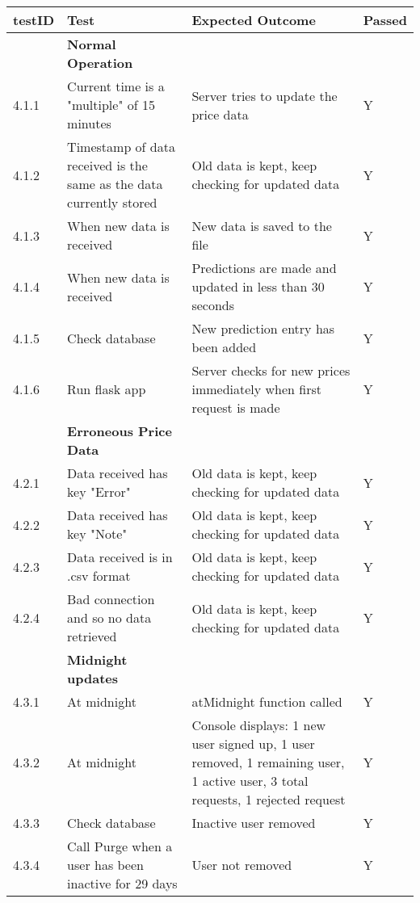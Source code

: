     \begin{tabular}{|p{1cm}|p{4cm}|p{4cm}|p{2cm}|}
        \hline
        testID & Test & Expected Outcome & Passed\\
        \hline\hline
        & \textbf{Normal Operation} & &\\
        \hline
        4.1.1 & Current time is a "multiple" of 15 minutes & Server tries to update the price data & Y\\
        \hline 
        4.1.2 & Timestamp of data received is the same as the data currently stored & Old data is kept, keep checking for updated data & Y\\
        \hline
        4.1.3 & When new data is received & New data is saved to the file & Y\\
        \hline
        4.1.4 & When new data is received & Predictions are made and updated in less than 30 seconds & Y\\
        \hline
        4.1.5 & Check database & New prediction entry has been added & Y\\
        \hline
        4.1.6 & Run flask app & Server checks for new prices immediately when first request is made & Y\\
        \hline\hline
        & \textbf{Erroneous Price Data} & &\\
        \hline
        4.2.1 & Data received has key "Error" & Old data is kept, keep checking for updated data & Y\\
        \hline
        4.2.2 & Data received has key "Note"& Old data is kept, keep checking for updated data & Y\\
        \hline
        4.2.3 & Data received is in .csv format & Old data is kept, keep checking for updated data & Y\\
        \hline
        4.2.4 & Bad connection and so no data retrieved & Old data is kept, keep checking for updated data & Y\\
        \hline\hline
        & \textbf{Midnight updates} & &\\
        \hline
        4.3.1 & At midnight & atMidnight function called & Y\\
        \hline
        4.3.2 & At midnight & Console displays: 1 new user signed up, 1 user removed, 1 remaining user, 1 active user, 3 total requests, 1 rejected request & Y \\
        \hline
        4.3.3 & Check database & Inactive user removed & Y\\
        \hline
        4.3.4 & Call Purge when a user has been inactive for 29 days & User not removed & Y\\
        \hline
    \end{tabular}